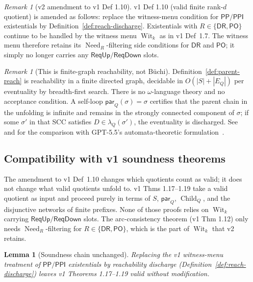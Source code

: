 \documentclass[11pt]{article}
\newtheorem{lemma}[theorem]{Lemma}
\theoremstyle{definition}
\theoremstyle{remark}
\newtheorem{remark}[theorem]{Remark}
\newcommand{\DR}{\mathsf{DR}}
\newcommand{\PO}{\mathsf{PO}}
\newcommand{\PP}{\mathsf{PP}}
\newcommand{\PPI}{\mathsf{PPI}}
\newcommand{\Child}{\operatorname{Child}}
\newcommand{\Wit}{\operatorname{Wit}}
\newcommand{\Need}{\operatorname{Need}}
\begin{document}
\begin{remark}[v2 amendment to v1 Def 1.10]
v1 Def 1.10 (valid finite rank-$d$ quotient) is amended as
follows: replace the witness-menu condition for $\PP/\PPI$
existentials by Definition~\ref{def:reach-discharge}.
Existentials with $R \in \{\DR, \PO\}$ continue to be handled by
the witness menu $\Wit_k$ as in v1 Def~1.7. The witness menu
therefore retains its $\Need_R$-filtering side conditions for
$\DR$ and $\PO$; it simply no longer carries any $\mathsf{ReqUp}/
\mathsf{ReqDown}$ slots.
\end{remark}

\begin{remark}[This is finite-graph reachability, not B\"uchi]
Definition~\ref{def:parent-reach} is reachability in a finite
directed graph, decidable in $O(|S| + |E_Q|)$ per eventuality by
breadth-first search. There is no $\omega$-language theory and no
acceptance condition. A self-loop
$\mathsf{par}_Q(\sigma) = \sigma$ certifies that the parent chain
in the unfolding is infinite and remains in the strongly
connected component of $\sigma$; if some $\sigma'$ in that SCC
satisfies $D \in \lambda_Q(\sigma')$, the eventuality is
discharged. See~\cite[\S 11]{CompletenessV2} and
\cite[Remark 11.5]{CompletenessV2} for the comparison with
GPT-5.5's automata-theoretic
formulation~\cite[Def 6.4]{GPT55Generated}.
\end{remark}

\subsection{Compatibility with v1 soundness theorems}

The amendment to v1 Def~1.10 changes which quotients count as
valid; it does not change what valid quotients unfold to. v1
Thms 1.17--1.19 take a valid quotient as input and proceed
purely in terms of $S$, $\mathsf{par}_Q$, $\Child_Q$, and the
disjunctive networks of finite prefixes. None of those proofs
relies on $\Wit_k$ carrying $\mathsf{ReqUp}/\mathsf{ReqDown}$
slots. The arc-consistency theorem (v1 Thm 1.12) only needs
$\Need_R$-filtering for $R \in \{\DR, \PO\}$, which is the part of
$\Wit_k$ that v2 retains.

\begin{lemma}[Soundness chain unchanged]
\label{lem:soundness-chain-eventualities}
Replacing the v1 witness-menu treatment of $\PP/\PPI$
existentials by reachability discharge
(Definition~\ref{def:reach-discharge}) leaves v1 Theorems
1.17--1.19 valid without modification.
\end{lemma}
\end{document}
